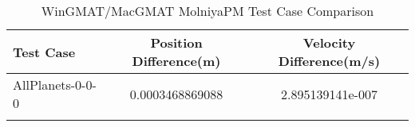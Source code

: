 \begin{table}[htbp!]
\centering
\caption{ WinGMAT/MacGMAT MolniyaPM Test Case Comparison}
      \begin{tabular}{lcc}
      \hline\hline
          Test Case & Position Difference(m) & Velocity Difference(m/s) \\
         \hline
         AllPlanets-0-0-0 & 0.0003468869088 & 2.895139141e-007 \\
      \hline\hline
      \label{Table: MolniyaPM WinGMAT-MacGMAT Table} 
\end{tabular}
\end{table}
